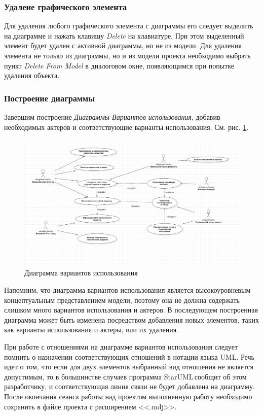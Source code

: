 \documentclass[a4paper,12pt]{report}
\newcommand{\staruml}{StarUML\,\tm}
\begin{document}
\subsubsection*{Удалеие графического элемента}
Для удаления любого графического элемента с диаграммы его следует выделить на диаграмме и нажать клавишу \textit{Delete} на клавиатуре. При этом выделенный элемент будет удален с активной диаграммы, но не из модели. Для удаления элемента не только из диаграммы, но и из модели проекта необходимо выбрать пункт \textit{Delete From Model} в диалоговом окне, появляющимся при попытке удаления объекта. 

\subsubsection*{Построение диаграммы}
Завершим построение \textit{Диаграммы Вариантов использования}, добавив необходимых актеров и соответствующие варианты использования. См. рис. \ref{fig:usecase}.
\newpage
\begin{figure}[h!]
	\centering
	\includegraphics[width=\linewidth]{images/usecase}
	\caption{Диаграмма вариантов использования}
	\label{fig:usecase}
\end{figure}

Напомним, что диаграмма вариантов использования является высокоуровневым концептуальным представлением модели, поэтому она не должна содержать слишком много вариантов использования и актеров. В последующем построенная диаграмма может быть изменена посредством добавления новых элементов, таких как варианты использования и актеры, или их удаления.

При работе с отношениями на диаграмме вариантов использования следует помнить о назначении соответствующих отношений в нотации языка UML. Речь идет о том, что если для двух элементов выбранный вид отношения не является допустимым, то в большинстве случаев программа \staruml сообщит об этом разработчику, и соответствующая линия связи не будет добавлена на диаграмму.
После окончания сеанса работы над проектом выполненную работу необходимо сохранить в файле проекта с расширением <<.mdj>>. 
\end{document}
